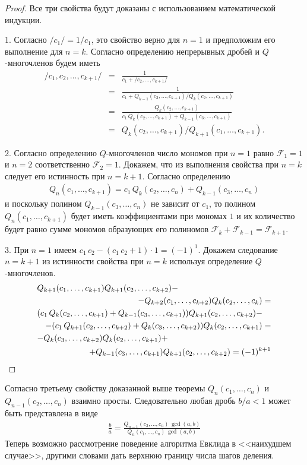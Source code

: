 \documentclass[14pt]{extreport}
\begin{document}
\begin{proof} Все три свойства будут доказаны с использованием
математической индукции.

1. Согласно $/c_1/ = {1}/{ c_1}$, это свойство верно для $n=1$  и предположим
его выполнение для $n=k$. Согласно определению непрерывных дробей
и $Q$-многочленов будем иметь
\begin{eqnarray*}
 /c_1, c_2, \ldots, c_{k+1}/ & =& \frac{1}{c_1 + /c_2, \ldots, c_{k+1}/}
 \\
  &=& \frac{1}{c_1 + Q_{k-1}(c_3, \ldots, c_{k+1})/ Q_k(c_2, \ldots, c_{k+1})}
 \\
 &=& \frac{Q_k(c_2, \ldots, c_{k+1})}
   {c_1\, Q_k(c_2, \ldots, c_{k+1}) + Q_{k-1}(c_3, \ldots, c_{k+1})}
 \\
&=& Q_k(c_2, \ldots, c_{k+1})/Q_{k+1}(c_1, \ldots, c_{k+1}).
\end{eqnarray*}

2. Согласно определению $Q$-многочленов число мономов при $n=1$ равно
$\mathcal{F}_{1} = 1$ и $n=2$ соответственно $\mathcal{F}_{2} = 1$. Докажем,
что из выполнения свойства при $n=k$ следует его истинность при  $n=k+1$.
Согласно определению
\begin{eqnarray*}
 Q_n(c_1,  \ldots, c_{k+1}) =
   c_1 \, Q_{k}(c_2, \ldots, c_n) + Q_{k-1}(c_3, \ldots, c_n)
\end{eqnarray*}
и поскольку полином $Q_{k-1}(c_3, \ldots, c_n)$ не зависит от $c_1$, то
полином $Q_n(c_1,  \ldots, c_{k+1})$ будет иметь коэффициентами при
мономах $1$ и их количество будет равно сумме мономов образующих
его полиномов  $\mathcal{F}_{k} + \mathcal{F}_{k-1} = \mathcal{F}_{k+1}$.


3. При $n=1$ имеем
$c_1 \, c_2 - (c_1 \, c_2 + 1) \cdot 1 = (-1)^1$.
Докажем следование $n=k+1$ из истинности свойства при $n=k$ используя
определение $Q$-многочленов.
\begin{eqnarray*}
\lefteqn{Q_{k+1}(c_1, \ldots, c_{k+1}) Q_{k+1}(c_2, \ldots, c_{k+2})-}
\\
& &-Q_{k+2}(c_1, \ldots, c_{k+2}) Q_{k}(c_2, \ldots, c_{k}) =
\\
\lefteqn{(c_1\, Q_{k}(c_2, \ldots, c_{k+1})
+ Q_{k-1}(c_3, \ldots, c_{k+1})) Q_{k+1}(c_2, \ldots, c_{k+2})-}\\
&&- (c_1\,Q_{k+1}(c_2, \ldots, c_{k+2}) + Q_{k}(c_3, \ldots, c_{k+2}))
Q_{k}(c_2, \ldots, c_{k+1})= \\
\lefteqn{-Q_{k}(c_3, \ldots, c_{k+2}) Q_{k}(c_2, \ldots, c_{k+1}) +}\\
&&+ Q_{k-1}(c_3, \ldots, c_{k+1}) Q_{k+1}(c_2, \ldots, c_{k+2}) = (-1)^{k+1}
\end{eqnarray*}
\end{proof}
Согласно третьему свойству доказанной выше теоремы
$Q_{n}(c_1, \ldots, c_n)$ и $Q_{n-1}(c_2, \ldots, c_n)$ взаимно просты.
Следовательно любая дробь $b/a < 1$ может быть представлена в виде
\begin{eqnarray}
\frac{b}{a} = \frac{Q_{n-1}(c_2, \ldots, c_n)\, \gcd(a, b)}
                   {Q_{n}(c_1, \ldots, c_n)\, \gcd(a, b)}
 \label{l17}
\end{eqnarray}
Теперь возможно рассмотрение поведение алгоритма Евклида в
<<наихудшем случае>>, другими словами дать верхнюю границу числа
шагов деления.
\end{document}
